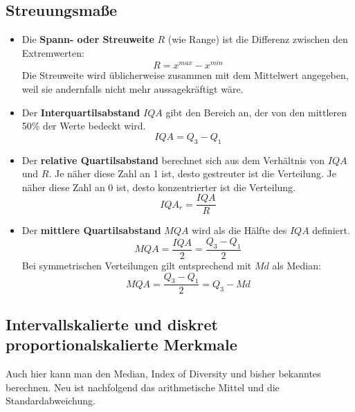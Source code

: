 \subsection{Streuungsmaße}
\begin{itemize}
    \item Die \textbf{Spann- oder Streuweite} $R$ (wie Range) ist die Differenz zwischen den Extremwerten:
    \[R = x^{max} - x^{min}\]
    Die Streuweite wird üblicherweise zusammen mit dem Mittelwert angegeben, weil sie andernfalls nicht mehr aussagekräftigt wäre.
    \item Der \textbf{Interquartilsabstand} $IQA$ gibt den Bereich an, der von den mittleren 50\% der Werte bedeckt wird.
    \[IQA = Q_3 - Q_1\]
    \item Der \textbf{relative Quartilsabstand} berechnet sich aus dem Verhältnis von $IQA$ und $R$.
    Je näher diese Zahl an 1 ist, desto gestreuter ist die Verteilung.
    Je näher diese Zahl an 0 ist, desto konzentrierter ist die Verteilung.
    \[IQA_r = \frac{IQA}{R}\]
    \item Der \textbf{mittlere Quartilsabstand} $MQA$ wird als die Hälfte des $IQA$ definiert.
    \[MQA = \frac{IQA}{2} = \frac{Q_3 - Q_1}{2}\]
    Bei symmetrischen Verteilungen gilt entsprechend mit $Md$ als Median:
    \[MQA = \frac{Q_3 - Q_1}{2} = Q_3 - Md\]
\end{itemize}

\subsection{Intervallskalierte und diskret proportionalskalierte Merkmale}
Auch hier kann man den Median, Index of Diversity und bisher bekanntes berechnen.
Neu ist nachfolgend das arithmetische Mittel und die Standardabweichung.

